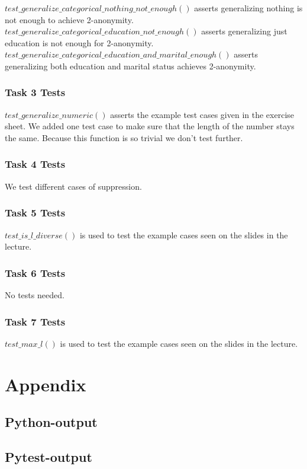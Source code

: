 \documentclass{article}
\begin{document}
			$test\_generalize\_categorical\_nothing\_not\_enough()$ asserts generalizing nothing is not enough to achieve 2-anonymity. \\
			$test\_generalize\_categorical\_education\_not\_enough()$ asserts generalizing just education is not enough for 2-anonymity.\\
			$test\_generalize\_categorical\_education\_and\_marital\_enough()$ asserts generalizing both education and marital status achieves 2-anonymity.
			
		\subsubsection{Task 3 Tests}
			$test\_generalize\_numeric()$ asserts the example test cases given in the exercise sheet. We added one test case to make sure that the length of the number stays the same. Because this function is so trivial we don't test further.
		\subsubsection{Task 4 Tests}
			We test different cases of suppression.
		\subsubsection{Task 5 Tests}
			$test\_is\_l\_diverse()$ is used to test the example cases seen on the slides in the lecture.
		\subsubsection{Task 6 Tests}
			No tests needed.
		\subsubsection{Task 7 Tests}
			$test\_max\_l()$ is used to test the example cases seen on the slides in the lecture.
	
		\section{Appendix}
			\subsection{Python-output}\label{lst:python-output}
				
			\subsection{Pytest-output}
				\label{lst:pytest-output}
\end{document}

